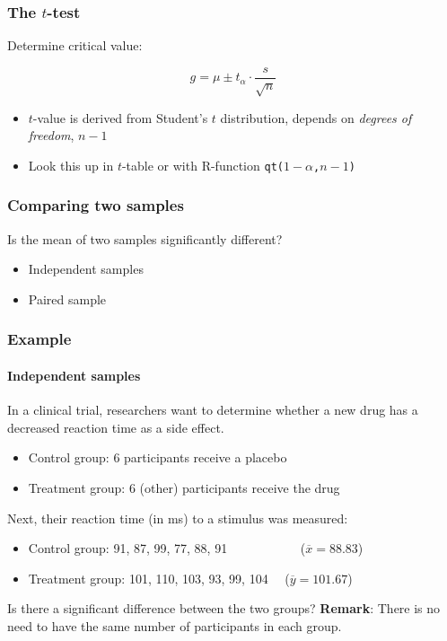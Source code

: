 \documentclass{beamer}
\begin{document}
\begin{frame}
  \frametitle{The $t$-test}
  
  Determine critical value:
  
  \[ g = \mu \pm t_\alpha \cdot \frac{s}{\sqrt{n}} \]
  
  \begin{itemize}
    \item $t$-value is derived from Student's $t$ distribution, depends on \emph{degrees of freedom}, $n-1$
    \item Look this up in $t$-table or with R-function \texttt{qt($1-\alpha$,$n-1$)}
  \end{itemize}
  
\end{frame}

\begin{frame}
  \frametitle{Comparing two samples}
  
  Is the mean of two samples significantly different?
  
  \begin{itemize}
    \item Independent samples
    \item Paired sample
  \end{itemize}
\end{frame}

\begin{frame}
  \frametitle{Example}
  \framesubtitle{Independent samples}
  
  In a clinical trial, researchers want to determine whether a new drug has a decreased reaction time as a side effect.
  
  \begin{itemize}
    \item Control group: 6 participants receive a placebo
    \item Treatment group: 6 (other) participants receive the drug
  \end{itemize}
  
  Next, their reaction time (in ms) to a stimulus was measured:
  
  \begin{itemize}
    \item Control group: 91, 87, 99, 77, 88, 91 ~~~~~~~~~~~($\overline{x}=88.83$)
    \item Treatment group: 101, 110, 103, 93, 99, 104 ~~($\overline{y}=101.67$)
  \end{itemize}
  
  Is there a significant difference between the two groups?
\vfill
  \textbf{Remark}: There is no need to have the same number of participants in each group.
\end{frame}
\end{document}

